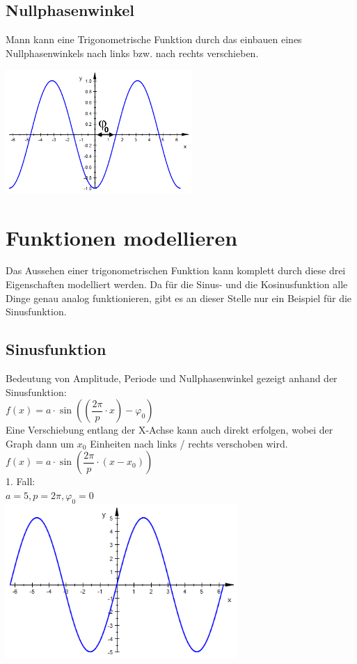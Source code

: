 \documentclass[11pt,final]{scrreprt}
\begin{document}
\subsection{Nullphasenwinkel}
Mann kann eine Trigonometrische Funktion durch das einbauen eines Nullphasenwinkels nach links bzw. nach rechts verschieben. 
\begin{center}
\includegraphics[width=200pt]{images/nullphase_1}\\
\end{center}
\section{Funktionen modellieren}
Das Aussehen einer trigonometrischen Funktion kann komplett durch diese drei Eigenschaften modelliert werden. Da für die Sinus- und die Kosinusfunktion alle Dinge genau analog funktionieren, gibt es an dieser Stelle nur ein Beispiel für die Sinusfunktion.
\subsection{Sinusfunktion}
Bedeutung von Amplitude, Periode und Nullphasenwinkel gezeigt anhand der Sinusfunktion:\\
$ f(x) = a \cdot \sin((\dfrac{2\pi}{p}\cdot x)-\varphi_0) $\\

Eine Verschiebung entlang der X-Achse kann auch direkt erfolgen, wobei der Graph dann um $x_0$ Einheiten nach links / rechts verschoben wird.\\
$ f(x) = a \cdot \sin(\dfrac{2\pi}{p}\cdot (x-x_0)) $\\

1. Fall:\\
$ a=5, p=2\pi, \varphi_0=0$\\
\includegraphics[width=250pt]{images/sinus_1}\\
\end{document}
